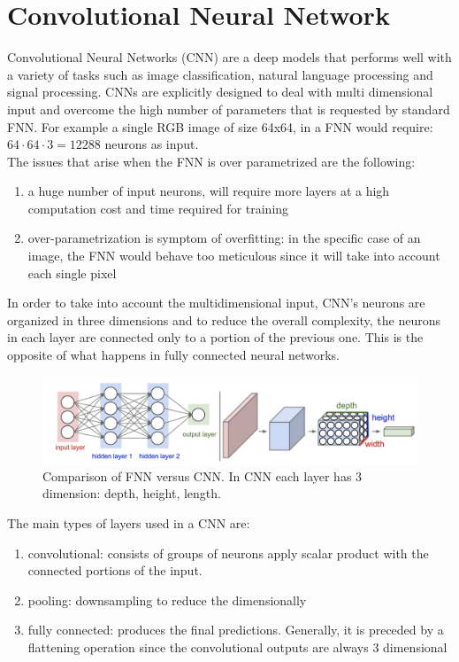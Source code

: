 \documentclass[LaM,binding=0.6cm]{sapthesis}
\begin{document}
\section{Convolutional Neural Network}
Convolutional Neural Networks (CNN) are a deep models that performs well with a variety of tasks such as image classification, natural language processing and signal processing. CNNs are explicitly designed to deal with multi dimensional input and overcome the high number of parameters that is requested by standard FNN. For example a single RGB image of size 64x64, in a FNN would require: $64\cdot64\cdot3=12288$ neurons as input.\\The issues that arise when the FNN is over parametrized are the following:
\begin{enumerate}
\item a huge number of input neurons, will require more layers at a high computation cost and time required for training 
\item over-parametrization is symptom of overfitting: in the specific case of an image, the FNN would behave too meticulous since it will take into account each single pixel
\end{enumerate}
In order to take into account the multidimensional input, CNN's neurons are organized in three dimensions and to reduce the overall complexity, the neurons in each layer are connected only to a portion of the previous one. This is the opposite of what happens in fully connected neural networks. 
\begin{figure}[H]  \centering
	\includegraphics[width=150mm,scale=0.7]{convgen}
	\caption{Comparison of FNN versus CNN. In CNN each layer has 3 dimension: depth, height, length.\cite{cnnsite}}
	\label{fig:convgen}
\end{figure}
The main types of layers used in a CNN are:
\begin{enumerate}
\item convolutional: consists of groups of neurons apply scalar product with the connected portions of the input.
\item pooling: downsampling to reduce the dimensionally 
\item fully connected: produces the final predictions. Generally, it is preceded by a flattening operation since the convolutional outputs are always 3 dimensional
\end{enumerate}
\end{document}
